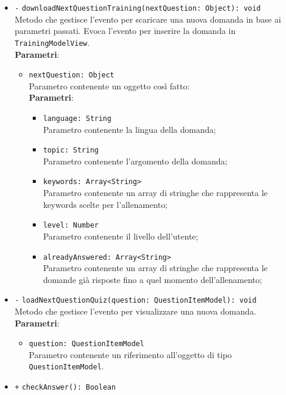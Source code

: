 \begin{itemize}
\begin{itemize}
\begin{itemize}
	\end{itemize}
	\item \texttt{-} \texttt{downloadNextQuestionTraining(nextQuestion: Object): void} \\
	Metodo che gestisce l'evento per scaricare una nuova domanda in base ai parametri passati. Evoca l'evento per inserire la domanda in \texttt{TrainingModelView}. \\
	\textbf{Parametri}:
	\begin{itemize}
		\item \texttt{nextQuestion: Object} \\
		Parametro contenente un oggetto così fatto: \\
		\textbf{Parametri}:
		\begin{itemize}
			\item \texttt{language: String} \\
			Parametro contenente la lingua della domanda;
			\item \texttt{topic: String} \\
			Parametro contenente l'argomento della domanda;
			\item \texttt{keywords: Array<String>} \\
			Parametro contenente un array di stringhe che rappresenta le keywords scelte per l'allenamento;
			\item \texttt{level: Number} \\
			Parametro contenente il livello dell'utente;
			\item \texttt{alreadyAnswered: Array<String>} \\
			Parametro contenente un array di stringhe che rappresenta le domande già risposte fino a quel momento dell'allenamento;
		\end{itemize}
	\end{itemize}
	\item \texttt{-} \texttt{loadNextQuestionQuiz(question: QuestionItemModel): void} \\
	Metodo che gestisce l'evento per visualizzare una nuova domanda. \\
	\textbf{Parametri}:
	\begin{itemize}
		\item \texttt{question: QuestionItemModel} \\
		Parametro contenente un riferimento all'oggetto di tipo \texttt{QuestionItemModel}.
	\end{itemize}
	\item \texttt{+} \texttt{checkAnswer(): Boolean} \\ 

\end{itemize}
\end{itemize}
